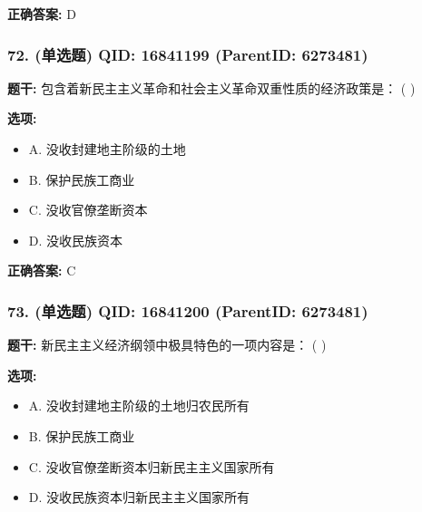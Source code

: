 \documentclass[12pt,UTF8]{ctexart}
\begin{document}
\textbf{正确答案:}
D

\vspace{0.3em}\hrulefill\vspace{0.7em}

\subsubsection*{72. (单选题) \small QID: 16841199 (ParentID: 6273481)}

\textbf{题干:}
包含着新民主主义革命和社会主义革命双重性质的经济政策是： ( )



\textbf{选项:}
\begin{itemize}[leftmargin=*]

  \item A. 没收封建地主阶级的土地

  \item B. 保护民族工商业

  \item C. 没收官僚垄断资本

  \item D. 没收民族资本

\end{itemize}

\textbf{正确答案:}
C

\vspace{0.3em}\hrulefill\vspace{0.7em}

\subsubsection*{73. (单选题) \small QID: 16841200 (ParentID: 6273481)}

\textbf{题干:}
新民主主义经济纲领中极具特色的一项内容是： ( )



\textbf{选项:}
\begin{itemize}[leftmargin=*]

  \item A. 没收封建地主阶级的土地归农民所有

  \item B. 保护民族工商业

  \item C. 没收官僚垄断资本归新民主主义国家所有

  \item D. 没收民族资本归新民主主义国家所有

\end{itemize}
\end{document}
